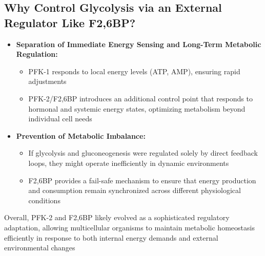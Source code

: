 \documentclass[10pt]{article}
\begin{document}
\subsection*{Why Control Glycolysis via an External Regulator Like F2,6BP?}
\begin{itemize}
	\item \textbf{Separation of Immediate Energy Sensing and Long-Term Metabolic Regulation:}
	\begin{itemize}
        \item PFK-1 responds to local energy levels (ATP, AMP), ensuring rapid adjustments
        \item PFK-2/F2,6BP introduces an additional control point that responds to hormonal and systemic energy states, optimizing metabolism beyond individual cell needs
    \end{itemize}
	\item \textbf{Prevention of Metabolic Imbalance:}
	\begin{itemize}
        \item If glycolysis and gluconeogenesis were regulated solely by direct feedback loops, they might operate inefficiently in dynamic environments
        \item F2,6BP provides a fail-safe mechanism to ensure that energy production and consumption remain synchronized across different physiological conditions
    \end{itemize}
\end{itemize}
Overall, PFK-2 and F2,6BP likely evolved as a sophisticated regulatory adaptation, allowing multicellular organisms to maintain metabolic homeostasis efficiently in response to both internal energy demands and external environmental changes
\end{document}
